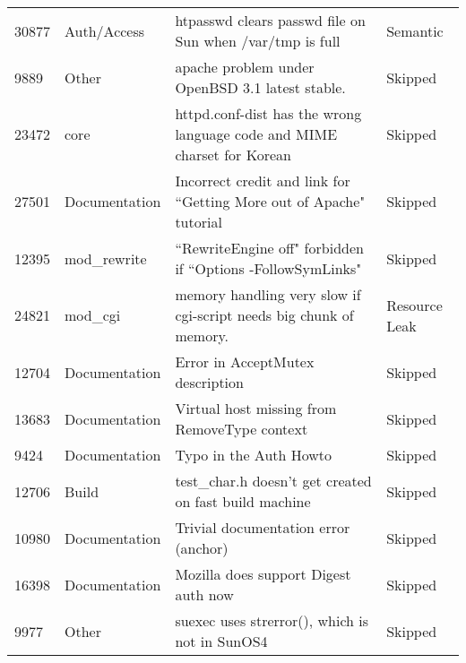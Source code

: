 \begin{longtable}[c]{llll}
30877  & Auth/Access        & htpasswd clears passwd file on Sun when /var/tmp is full                                                       & Semantic          \\
9889   & Other              & apache problem under OpenBSD 3.1 latest stable.                                                                & Skipped           \\
23472  & core               & httpd.conf-dist has the wrong language code and MIME charset  for Korean                                       & Skipped           \\
27501  & Documentation      & Incorrect credit and link for ``Getting More out of Apache" tutorial                                            & Skipped           \\
12395  & mod\_rewrite       & ``RewriteEngine off" forbidden if ``Options -FollowSymLinks"                                                     & Skipped           \\
24821  & mod\_cgi           & memory handling very slow if cgi-script needs big chunk of memory.                                             & Resource Leak     \\
12704  & Documentation      & Error in AcceptMutex description                                                                               & Skipped           \\
13683  & Documentation      & Virtual host missing from RemoveType context                                                                   & Skipped           \\
9424   & Documentation      & Typo in the Auth Howto                                                                                         & Skipped           \\
12706  & Build              & test\_char.h doesn't get created on fast build machine                                                         & Skipped           \\
10980  & Documentation      & Trivial documentation error (anchor)                                                                           & Skipped           \\
16398  & Documentation      & Mozilla does support Digest auth now                                                                           & Skipped           \\
9977   & Other              & suexec uses strerror(), which is not in SunOS4                                                                 & Skipped           \\

\end{longtable}
